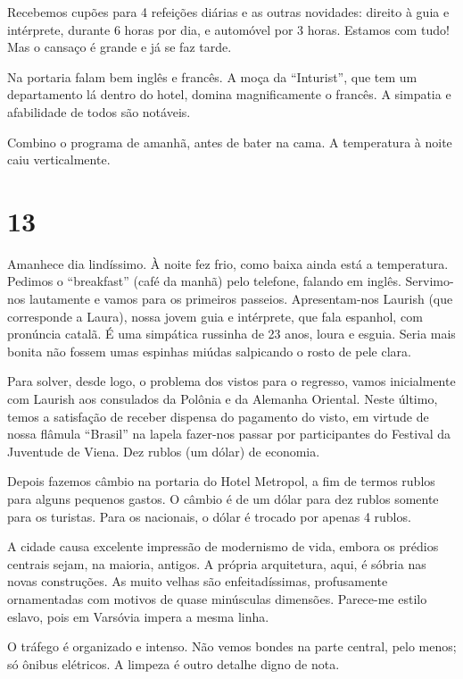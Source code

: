 Recebemos cupões para 4 refeições diárias e as outras novidades: direito à guia e intérprete, durante 6 horas por dia, e automóvel por 3 horas. Estamos com tudo! Mas o cansaço é grande e já se faz tarde.

Na portaria falam bem inglês e francês. A moça da ``Inturist'', que tem um departamento lá dentro do hotel, domina magnificamente o francês. A simpatia e afabilidade de todos são notáveis.

Combino o programa de amanhã, antes de bater na cama. A temperatura à noite caiu verticalmente.

\section*{13 \adfflatleafright {}}
Amanhece dia lindíssimo. À noite fez frio, como baixa ainda está a temperatura. Pedimos o ``breakfast'' (café da manhã) pelo telefone, falando em inglês. Servimo-nos lautamente e vamos para os primeiros passeios. Apresentam-nos Laurish (que corresponde a Laura), nossa jovem guia e intérprete, que fala espanhol, com pronúncia catalã. É uma simpática russinha de 23 anos, loura e esguia. Seria mais bonita não fossem umas espinhas miúdas salpicando o rosto de pele clara.

Para solver, desde logo, o problema dos vistos para o regresso, vamos inicialmente com Laurish aos consulados da Polônia e da Alemanha Oriental. Neste último, temos a satisfação de receber dispensa do pagamento do visto, em virtude de nossa flâmula ``Brasil'' na lapela fazer-nos passar por participantes do Festival da Juventude de Viena. Dez rublos (um dólar) de economia.

Depois fazemos câmbio na portaria do Hotel Metropol, a fim de termos rublos para alguns pequenos gastos. O câmbio é de um dólar para dez rublos somente para os turistas. Para os nacionais, o dólar é trocado por apenas 4 rublos.

A cidade causa excelente impressão de modernismo de vida, embora os prédios centrais sejam, na maioria, antigos. A própria arquitetura, aqui, é sóbria nas novas construções. As muito velhas são enfeitadíssimas, profusamente ornamentadas com motivos de quase minúsculas dimensões. Parece-me estilo eslavo, pois em Varsóvia impera a mesma linha.

O tráfego é organizado e intenso. Não vemos bondes na parte central, pelo menos; só ônibus elétricos. A limpeza é outro detalhe digno de nota.

